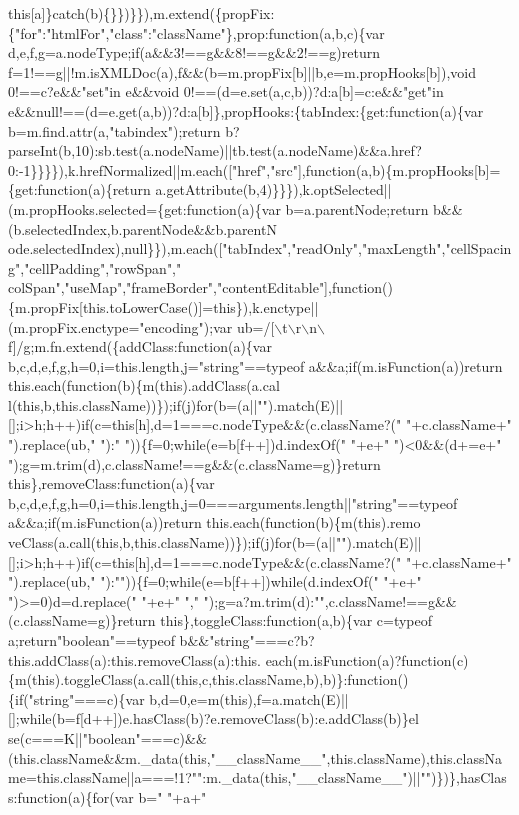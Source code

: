\begin{DoxyCode}
{       this[a]\}catch(b)\{\}\})\}\}),m.extend(\{propFix:\{"for":"htmlFor","class":"className"\},prop:function(a,b,c)\{var d,e,f,g=a.nodeType;if(a&&3!==g&&8!==g&&2!==g)return
       f=1!==g||!m.isXMLDoc(a),f&&(b=m.propFix[b]||b,e=m.propHooks[b]),void 0!==c?e&&"set"in e&&void
       0!==(d=e.set(a,c,b))?d:a[b]=c:e&&"get"in e&&null!==(d=e.get(a,b))?d:a[b]\},propHooks:\{tabIndex:\{get:function(a)\{var
       b=m.find.attr(a,"tabindex");return
       b?parseInt(b,10):sb.test(a.nodeName)||tb.test(a.nodeName)&&a.href?0:-1\}\}\}\}),k.hrefNormalized||m.each(["href","src"],function(a,b)\{m.propHooks[b]=\{get:function(a)\{return
       a.getAttribute(b,4)\}\}\}),k.optSelected||(m.propHooks.selected=\{get:function(a)\{var b=a.parentNode;return
       b&&(b.selectedIndex,b.parentNode&&b.parentN
      ode.selectedIndex),null\}\}),m.each(["tabIndex","readOnly","maxLength","cellSpacing","cellPadding","rowSpan","
      colSpan","useMap","frameBorder","contentEditable"],function()\{m.propFix[this.toLowerCase()]=this\}),k.enctype||(m.propFix.enctype="encoding");var ub=/[\(\backslash\)t\(\backslash\)r\(\backslash\)n\(\backslash\)f]/g;m.fn.extend(\{addClass:function(a)\{var
       b,c,d,e,f,g,h=0,i=this.length,j="string"==typeof a&&a;if(m.isFunction(a))return
       this.each(function(b)\{m(this).addClass(a.cal
      l(this,b,this.className))\});if(j)for(b=(a||"").match(E)||[];i>h;h++)if(c=this[h],d=1===c.nodeType&&(c.className?(" "+c.className+" ").replace(ub," "):" "))\{f=0;while(e=b[f++])d.indexOf(" "+e+" ")<0&&(d+=e+"
       ");g=m.trim(d),c.className!==g&&(c.className=g)\}return this\},removeClass:function(a)\{var
       b,c,d,e,f,g,h=0,i=this.length,j=0===arguments.length||"string"==typeof a&&a;if(m.isFunction(a))return
       this.each(function(b)\{m(this).remo
      veClass(a.call(this,b,this.className))\});if(j)for(b=(a||"").match(E)||[];i>h;h++)if(c=this[h],d=1===c.nodeType&&(c.className?(" "+c.className+" ").replace(ub," "):""))\{f=0;while(e=b[f++])while(d.indexOf(" "+e+"
       ")>=0)d=d.replace(" "+e+" "," ");g=a?m.trim(d):"",c.className!==g&&(c.className=g)\}return
       this\},toggleClass:function(a,b)\{var c=typeof a;return"boolean"==typeof
       b&&"string"===c?b?this.addClass(a):this.removeClass(a):this.
      each(m.isFunction(a)?function(c)\{m(this).toggleClass(a.call(this,c,this.className,b),b)\}:function()\{if("string"===c)\{var
       b,d=0,e=m(this),f=a.match(E)||[];while(b=f[d++])e.hasClass(b)?e.removeClass(b):e.addClass(b)\}el
      se(c===K||"boolean"===c)&&(this.className&&m.\_data(this,"\_\_className\_\_",this.className),this.className=this.className||a===!1?"":m.\_data(this,"\_\_className\_\_")||"")\})\},hasClass:function(a)\{for(var b=" "+a+"
}
\end{DoxyCode}
